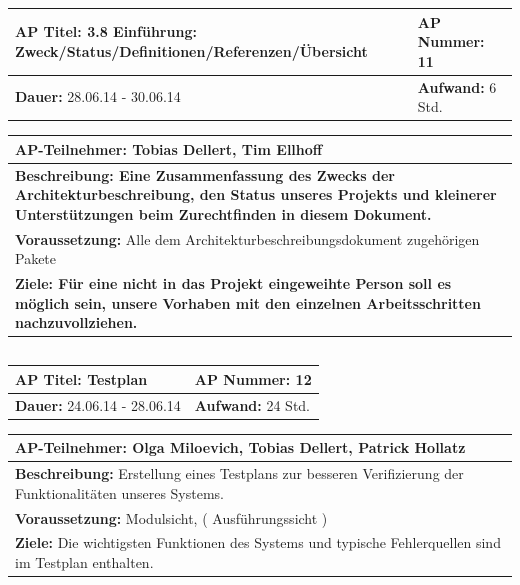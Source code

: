 \documentclass[fontsize=12pt,paper=a4,twoside]{scrartcl}
\begin{document}
\begin{tabular}{|p{7.43cm}|p{7.43cm}|}
\hline
\textbf{AP Titel: }3.8 Einführung: Zweck/Status/Definitionen/Referenzen/Übersicht & \textbf{AP Nummer: }11\\ 
\hline
\textbf{Dauer: }28.06.14 - 30.06.14& \textbf{Aufwand: }6 Std.\\
\hline
\end{tabular}
\begin{tabular}{|p{15.3cm}|}
\hline
\textbf{AP-Teilnehmer: }Tobias Dellert, Tim Ellhoff\\
\hline
\textbf{Beschreibung: Eine Zusammenfassung des Zwecks der Architekturbeschreibung, den Status unseres Projekts und kleinerer Unterstützungen beim Zurechtfinden in diesem Dokument.}\\
\hline
\textbf{Voraussetzung: }Alle dem Architekturbeschreibungsdokument zugehörigen Pakete\\
\hline 
\textbf{Ziele: Für eine nicht in das Projekt eingeweihte Person soll es möglich sein, unsere Vorhaben mit den einzelnen Arbeitsschritten nachzuvollziehen.}\\
\hline 
\end{tabular}
\begin{verbatim}

\end{verbatim}

\begin{tabular}{|p{7.43cm}|p{7.43cm}|}
\hline
\textbf{AP Titel: }Testplan & \textbf{AP Nummer: }12\\ 
\hline
\textbf{Dauer: }24.06.14 - 28.06.14& \textbf{Aufwand: }24 Std.\\
\hline
\end{tabular}
\begin{tabular}{|p{15.3cm}|}
\hline
\textbf{AP-Teilnehmer: }Olga Miloevich, Tobias Dellert, Patrick Hollatz\\
\hline
\textbf{Beschreibung: } Erstellung eines Testplans zur besseren Verifizierung der Funktionalitäten unseres Systems. \\
\hline
\textbf{Voraussetzung: }Modulsicht, ( Ausführungssicht )\\
\hline 
\textbf{Ziele: } Die wichtigsten Funktionen des Systems und typische Fehlerquellen sind im Testplan enthalten. \\
\hline 
\end{tabular}
\begin{verbatim}

\end{verbatim}
\end{document}
